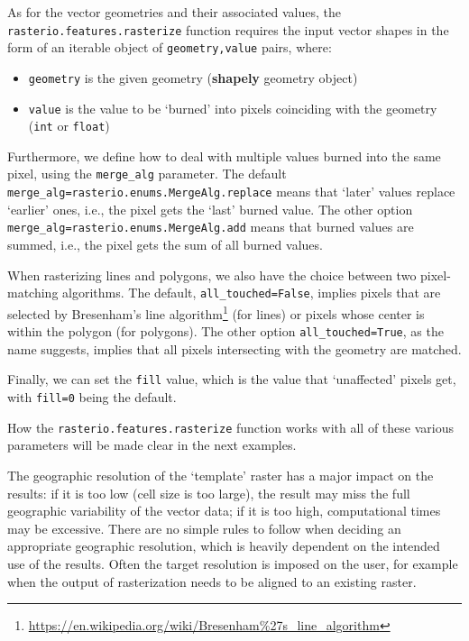 \documentclass[
  letterpaper,
]{krantz}
\providecommand{\tightlist}{%
  \setlength{\itemsep}{0pt}\setlength{\parskip}{0pt}}\usepackage{longtable,booktabs,array}
\begin{document}
As for the vector geometries and their associated values, the
\texttt{rasterio.features.rasterize} function requires the input vector
shapes in the form of an iterable object of \texttt{geometry,value}
pairs, where:

\begin{itemize}
\tightlist
\item
  \texttt{geometry} is the given geometry (\textbf{shapely} geometry
  object)
\item
  \texttt{value} is the value to be `burned' into pixels coinciding with
  the geometry (\texttt{int} or \texttt{float})
\end{itemize}

Furthermore, we define how to deal with multiple values burned into the
same pixel, using the \texttt{merge\_alg} parameter. The default
\texttt{merge\_alg=rasterio.enums.MergeAlg.replace} means that `later'
values replace `earlier' ones, i.e., the pixel gets the `last' burned
value. The other option \texttt{merge\_alg=rasterio.enums.MergeAlg.add}
means that burned values are summed, i.e., the pixel gets the sum of all
burned values.

When rasterizing lines and polygons, we also have the choice between two
pixel-matching algorithms. The default, \texttt{all\_touched=False},
implies pixels that are selected by Bresenham's line
algorithm\footnote{\url{https://en.wikipedia.org/wiki/Bresenham\%27s_line_algorithm}}
(for lines) or pixels whose center is within the polygon (for polygons).
The other option \texttt{all\_touched=True}, as the name suggests,
implies that all pixels intersecting with the geometry are matched.

Finally, we can set the \texttt{fill} value, which is the value that
`unaffected' pixels get, with \texttt{fill=0} being the default.

How the \texttt{rasterio.features.rasterize} function works with all of
these various parameters will be made clear in the next examples.

The geographic resolution of the `template' raster has a major impact on
the results: if it is too low (cell size is too large), the result may
miss the full geographic variability of the vector data; if it is too
high, computational times may be excessive. There are no simple rules to
follow when deciding an appropriate geographic resolution, which is
heavily dependent on the intended use of the results. Often the target
resolution is imposed on the user, for example when the output of
rasterization needs to be aligned to an existing raster.
\end{document}
